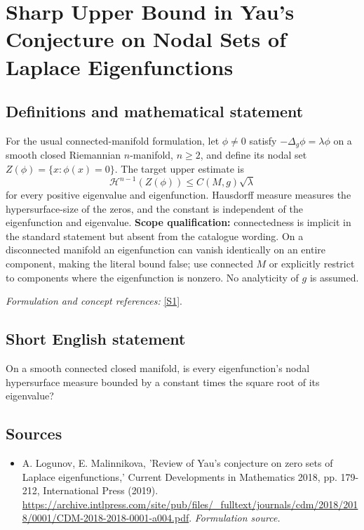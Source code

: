 \documentclass[11pt]{article}
\begin{document}
\section*{\texorpdfstring{Sharp Upper Bound in Yau's Conjecture on Nodal Sets of Laplace Eigenfunctions}{Sharp Upper Bound in Yau's Conjecture on Nodal Sets of Laplace Eigenfunctions}}\label{277}
\subsection{Definitions and mathematical statement}
For the usual connected-manifold formulation, let $\phi\ne0$ satisfy
$-\Delta_g\phi=\lambda\phi$ on a smooth closed Riemannian $n$-manifold, $n\ge2$, and define its nodal set $Z(\phi)=\{x:\phi(x)=0\}$. The target upper estimate is
\[
 \mathcal H^{n-1}(Z(\phi))\le C(M,g)\sqrt\lambda
\]
for every positive eigenvalue and eigenfunction. Hausdorff measure measures the hypersurface-size of the zeros, and the constant is independent of the eigenfunction and eigenvalue. \textbf{Scope qualification:} connectedness is implicit in the standard statement but absent from the catalogue wording. On a disconnected manifold an eigenfunction can vanish identically on an entire component, making the literal bound false; use connected $M$ or explicitly restrict to components where the eigenfunction is nonzero. No analyticity of $g$ is assumed.
\par\smallskip\textit{Formulation and concept references:} \href{https://archive.intlpress.com/site/pub/files/_fulltext/journals/cdm/2018/2018/0001/CDM-2018-2018-0001-a004.pdf}{[S1]}.

\subsection{Short English statement}
On a smooth connected closed manifold, is every eigenfunction's nodal hypersurface measure bounded by a constant times the square root of its eigenvalue?
\subsection{Sources}
\begin{itemize}
\item[S1]A. Logunov, E. Malinnikova, 'Review of Yau's conjecture on zero sets of Laplace eigenfunctions,' Current Developments in Mathematics 2018, pp. 179-212, International Press (2019).
\url{https://archive.intlpress.com/site/pub/files/_fulltext/journals/cdm/2018/2018/0001/CDM-2018-2018-0001-a004.pdf}.
\textit{Formulation source.}
\end{itemize}
\end{document}

